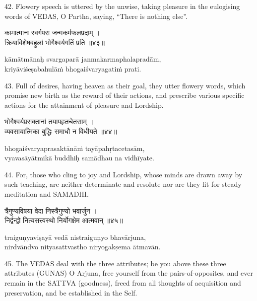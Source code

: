 42. Flowery speech is uttered by the unwise, taking pleasure in the eulogising
words of VEDAS, O Partha, saying, ``There is nothing else''.

\begin{gitaverse}
कामात्मानः स्वर्गपरा जन्मकर्मफलप्रदाम् । \\
क्रियाविशेषबहुलां भोगैश्वर्यगतिं प्रति ॥४३॥
\end{gitaverse}

\begin{transliteration}
kāmātmānaḥ svargaparā janmakarmaphalapradām, \\
kriyāviśeṣabahulāṁ bhogaiśvaryagatiṁ prati.
\end{transliteration}

43. Full of desires, having heaven as their goal, they utter flowery words,
which promise new birth as the reward of their actions, and prescribe various
specific actions for the attainment of pleasure and Lordship.

\begin{gitaverse}
भोगैश्वर्यप्रसक्तानां तयापहृतचेतसाम् । \\
व्यवसायात्मिका बुद्धिः समाधौ न विधीयते ॥४४॥
\end{gitaverse}

\begin{transliteration}
bhogaiśvaryaprasaktānāṁ tayāpahṛtacetasām, \\
vyavasāyātmikā buddhiḥ samādhau na vidhīyate.
\end{transliteration}

44. For, those who cling to joy and Lordship, whose minds are drawn away by
such teaching, are neither determinate and resolute nor are they fit for steady
meditation and SAMADHI.\@

\begin{gitaverse}
त्रैगुण्यविषया वेदा निस्त्रैगुण्यो भवार्जुन । \\
निर्द्वन्द्वो नित्यसत्त्वस्थो निर्योगक्षेम आत्मवान् ॥४५॥
\end{gitaverse}

\begin{transliteration}
traiguṇyaviṣayā vedā nistraiguṇyo bhavārjuna, \\
nirdvāndvo nityasattvastho niryogakṣema ātmavān.
\end{transliteration}

45. The VEDAS deal with the three attributes; be you above these three
attributes (GUNAS) O Arjuna, free yourself from the pairs-of-opposites, and ever
remain in the SATTVA (goodness), freed from all thoughts of acquisition and
preservation, and be established in the Self.

